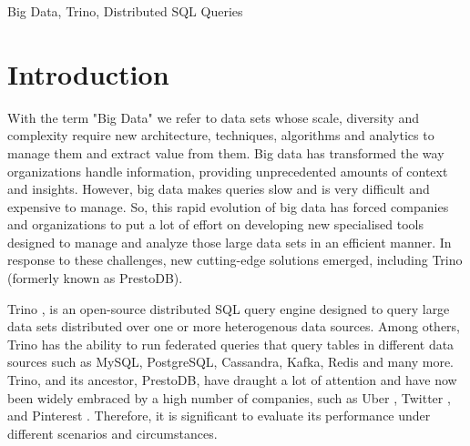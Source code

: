 \documentclass[conference]{IEEEtran}
\begin{document}
\begin{IEEEkeywords}
    Big Data, Trino, Distributed SQL Queries
\end{IEEEkeywords}

\section{Introduction}
With the term "Big Data" we refer to data sets whose scale, diversity and complexity require new
architecture, techniques, algorithms and analytics to manage them and extract value from them.
Big data has transformed the way organizations handle information, providing unprecedented
amounts of context and insights. However, big data makes queries slow and is very difficult and
expensive to manage. So, this rapid evolution of big data has forced companies and organizations
to put a lot of effort on  developing new specialised tools designed to manage and analyze those
large data sets in an efficient manner. In response to these challenges, new cutting-edge solutions
emerged, including Trino (formerly known as PrestoDB).

Trino \cite{b3}, is an open-source distributed SQL query engine designed to query large data sets distributed over
one or more heterogenous data sources. Among others, Trino has the ability to run federated queries that
query tables in different data sources such as MySQL, PostgreSQL, Cassandra, Kafka, Redis and many more.
Trino, and its ancestor, PrestoDB, have draught a lot of attention and have now been widely embraced by a high number of
companies, such as Uber \cite{b4}, Twitter \cite{b5}, \cite{b6} and Pinterest \cite{b7}. Therefore, it is significant to evaluate its performance under different
scenarios and circumstances.
\end{document}
